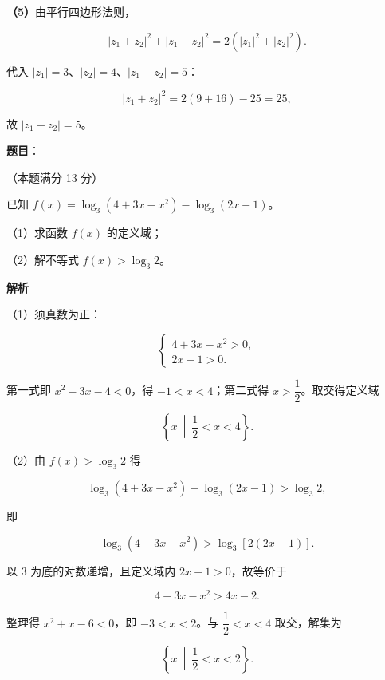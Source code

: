 \begin{answer}
\textbf{（5）}由平行四边形法则，

\nopagebreak[4]
\[
|z_1+z_2|^2+|z_1-z_2|^2=2(|z_1|^2+|z_2|^2).
\]

代入 $|z_1|=3$、$|z_2|=4$、$|z_1-z_2|=5$：

\nopagebreak[4]
\[
|z_1+z_2|^2=2(9+16)-25=25,
\]

故 $|z_1+z_2|=5$。






\end{answer}
\begin{answer}

\textbf{题目}：

（本题满分 13 分）

已知 $f(x)=\log_3(4+3x-x^2)-\log_3(2x-1)$。

（1）求函数 $f(x)$ 的定义域；

（2）解不等式 $f(x)>\log_3 2$。

\textbf{解析}

（1）须真数为正：

\nopagebreak[4]
\[
\begin{cases}
4+3x-x^2>0,\\
2x-1>0.
\end{cases}
\]

第一式即 $x^2-3x-4<0$，得 $-1<x<4$；第二式得 $x>\dfrac12$。取交得定义域

\nopagebreak[4]
\[
\left\{x\ \middle|\ \frac12<x<4\right\}.
\]

（2）由 $f(x)>\log_3 2$ 得

\nopagebreak[4]
\[
\log_3(4+3x-x^2)-\log_3(2x-1)>\log_3 2,
\]

即

\nopagebreak[4]
\[
\log_3(4+3x-x^2)>\log_3\left[2(2x-1)\right].
\]

以 $3$ 为底的对数递增，且定义域内 $2x-1>0$，故等价于

\nopagebreak[4]
\[
4+3x-x^2>4x-2.
\]

整理得 $x^2+x-6<0$，即 $-3<x<2$。与 $\dfrac12<x<4$ 取交，解集为

\nopagebreak[4]
\[
\left\{x\ \middle|\ \frac12<x<2\right\}.
\]


\end{answer}
